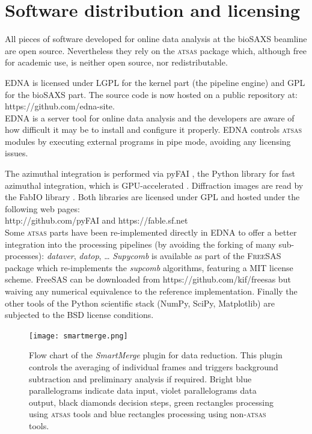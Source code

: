 \documentclass[preprint,pdf]{iucr}              %
\begin{document}
\section{Software distribution and licensing}

All pieces of software developed for online data analysis at the bioSAXS
beamline are open source.
Nevertheless they rely on the \textsc{atsas} package which, although free
for academic use, is neither open source, nor redistributable.

EDNA is licensed under LGPL for the kernel part (the pipeline engine) and GPL
for the bioSAXS part. The source code is now hosted on a public
repository at:\\
https://github.com/edna-site.\\
EDNA is a server tool for online data analysis and the developers are aware of
how difficult it may be to install and configure it properly. EDNA controls
\textsc{atsas} modules by executing external programs in pipe mode, avoiding
any licensing issues.

The azimuthal integration is performed via pyFAI \cite{pyFAI}, the Python library
for fast azimuthal integration, which is GPU-accelerated \cite{pyFAI_2015}.
Diffraction images are read by the FabIO library \cite{fabio}.
Both libraries are licensed under GPL and hosted under the following web
pages:\\
http://github.com/pyFAI and https://fable.sf.net\\
Some \textsc{atsas} parts have been re-implemented  directly in EDNA  
to offer a better integration into the processing pipelines (by avoiding the
forking of many sub-processes): \textit{dataver}, \textit{datop}, \ldots 
\textit{Supycomb} is available as part of the \textsc{FreeSAS} package which
re-implements the \textit{supcomb} algorithms, featuring a MIT license scheme. 
FreeSAS can be downloaded from
https://github.com/kif/freesas but waiving any numerical equivalence to the
reference implementation.
Finally the other tools of the Python scientific stack (NumPy, SciPy,
Matplotlib) are subjected to the BSD license conditions.


\begin{figure}
\centering
\texttt{[image: smartmerge.png]}%
\caption{Flow chart of the \textit{SmartMerge} plugin for data reduction.
This plugin controls the averaging of individual frames and triggers background
subtraction and preliminary analysis if required.
Bright blue parallelograms indicate data input, violet parallelograms data
output, black diamonds decision steps, green rectangles processing using
\textsc{atsas} tools and blue rectangles processing using non-\textsc{atsas} tools. }
\label{fgr:smart}
\end{figure}
\end{document}
